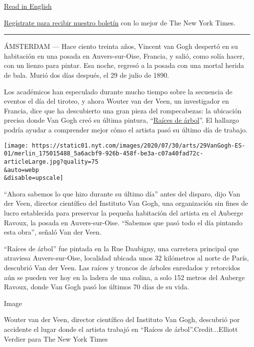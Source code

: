 \href{https://www.nytimes.com/2020/07/28/arts/design/vincent-van-gogh-tree-roots.html}{Read
in English}

\href{https://www.nytimes.com/newsletters/el-times}{Regístrate para
recibir nuestro boletín} con lo mejor de The New York Times.

\begin{center}\rule{0.5\linewidth}{\linethickness}\end{center}

ÁMSTERDAM --- Hace ciento treinta años, Vincent van Gogh despertó en su
habitación en una posada en Auvers-sur-Oise, Francia, y salió, como
solía hacer, con un lienzo para pintar. Esa noche, regresó a la posada
con una mortal herida de bala. Murió dos días después, el 29 de julio de
1890.

Los académicos han especulado durante mucho tiempo sobre la secuencia de
eventos el día del tiroteo, y ahora Wouter van der Veen, un investigador
en Francia, dice que ha descubierto una gran pieza del rompecabezas: la
ubicación precisa donde Van Gogh creó su última pintura,
``\href{https://www.vangoghmuseum.nl/en/collection/s0195V1962}{Raíces de
árbol}''. El hallazgo podría ayudar a comprender mejor cómo el artista
pasó su último día de trabajo.

\texttt{[image: https://static01.nyt.com/images/2020/07/30/arts/29VanGogh-ES-01/merlin\_175015488\_5a6acbf9-926b-458f-be3a-c07a40fad72c-articleLarge.jpg?quality=75\\\&auto=webp\\\&disable=upscale]}

``Ahora sabemos lo que hizo durante su último día'' antes del disparo,
dijo Van der Veen, director científico del Instituto Van Gogh, una
organización sin fines de lucro establecida para preservar la pequeña
habitación del artista en el Auberge Ravoux, la posada en
Auvers-sur-Oise. ``Sabemos que pasó todo el día pintando esta obra'',
señaló Van der Veen.

``Raíces de árbol'' fue pintada en la Rue Daubigny, una carretera
principal que atraviesa Auvers-sur-Oise, localidad ubicada unos 32
kilómetros al norte de París, descubrió Van der Veen. Las raíces y
troncos de árboles enredados y retorcidos aún se pueden ver hoy en la
ladera de una colina, a solo 152 metros del Auberge Ravoux, donde Van
Gogh pasó los últimos 70 días de su vida.

Image

Wouter van der Veen, director científico del Instituto Van Gogh,
descubrió por accidente el lugar donde el artista trabajó en ``Raíces de
árbol''.Credit...Elliott Verdier para The New York Times

